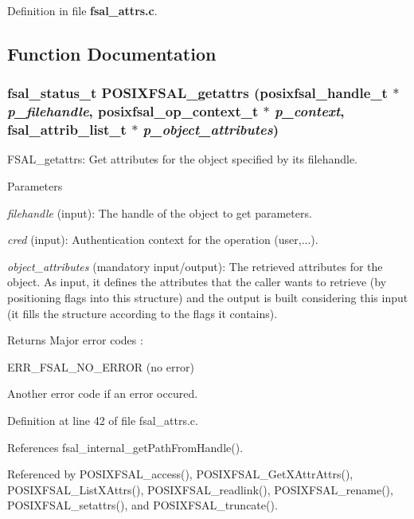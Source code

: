 Definition in file {\bf fsal\_\-attrs.c}.

\subsection{Function Documentation}
\subsubsection[{POSIXFSAL\_\-getattrs}]{\setlength{\rightskip}{0pt plus 5cm}fsal\_\-status\_\-t POSIXFSAL\_\-getattrs (posixfsal\_\-handle\_\-t $\ast$ {\em p\_\-filehandle}, \/  posixfsal\_\-op\_\-context\_\-t $\ast$ {\em p\_\-context}, \/  fsal\_\-attrib\_\-list\_\-t $\ast$ {\em p\_\-object\_\-attributes})}\label{fsal__attrs_8c_acec706d37f2f8d6abf47440024888d00}
FSAL\_\-getattrs: Get attributes for the object specified by its filehandle.


\begin{DoxyParams}{Parameters}
\item[{\em filehandle}](input): The handle of the object to get parameters. \item[{\em cred}](input): Authentication context for the operation (user,...). \item[{\em object\_\-attributes}](mandatory input/output): The retrieved attributes for the object. As input, it defines the attributes that the caller wants to retrieve (by positioning flags into this structure) and the output is built considering this input (it fills the structure according to the flags it contains).\end{DoxyParams}
\begin{DoxyReturn}{Returns}
Major error codes :
\begin{DoxyItemize}
\item ERR\_\-FSAL\_\-NO\_\-ERROR (no error)
\item Another error code if an error occured. 
\end{DoxyItemize}
\end{DoxyReturn}


Definition at line 42 of file fsal\_\-attrs.c.

References fsal\_\-internal\_\-getPathFromHandle().

Referenced by POSIXFSAL\_\-access(), POSIXFSAL\_\-GetXAttrAttrs(), POSIXFSAL\_\-ListXAttrs(), POSIXFSAL\_\-readlink(), POSIXFSAL\_\-rename(), POSIXFSAL\_\-setattrs(), and POSIXFSAL\_\-truncate().
